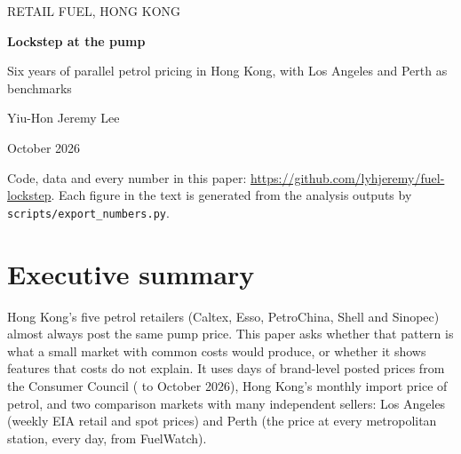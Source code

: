 \documentclass[11pt]{article}
\begin{document}
\begin{titlepage}
\vspace*{1.2in}
{\footnotesize\color{ink2}\MakeUppercase{Retail fuel, Hong Kong}}\par\vspace{8pt}
{\LARGE\bfseries Lockstep at the pump\par}\vspace{6pt}
{\large Six years of parallel petrol pricing in Hong Kong, with Los Angeles and Perth as benchmarks\par}
\vspace{28pt}
{\normalsize Yiu-Hon Jeremy Lee\par}
{\small\color{ink2}October 2026\par}
\vfill
{\small\color{ink2}Code, data and every number in this paper: \url{https://github.com/lyhjeremy/fuel-lockstep}. Each figure in the text is generated from the analysis outputs by \texttt{scripts/export\_numbers.py}.\par}
\end{titlepage}

\section*{Executive summary}

Hong Kong's five petrol retailers (Caltex, Esso, PetroChina, Shell and Sinopec) almost always post the same pump price. This paper asks whether that pattern is what a small market with common costs would produce, or whether it shows features that costs do not explain. It uses \hkDays{} days of brand-level posted prices from the Consumer Council (\hkStart{} to October 2026), Hong Kong's monthly import price of petrol, and two comparison markets with many independent sellers: Los Angeles (weekly EIA retail and spot prices) and Perth (the price at every metropolitan station, every day, from FuelWatch).
\end{document}
